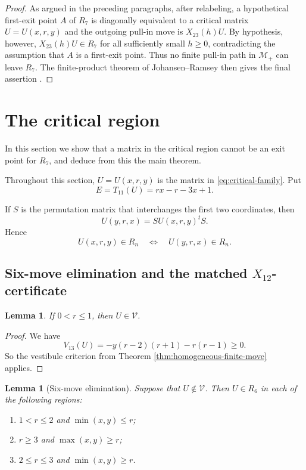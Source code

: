 \documentclass[11pt,onecolumn]{amsart}
\theoremstyle{plain}
\newtheorem{lemma}[theorem]{Lemma}
\theoremstyle{definition}
\theoremstyle{remark}
\newcommand{\V}{\mathcal V}
\begin{document}
\begin{proof}
As argued in the preceding paragraphs,  after relabeling, a hypothetical
first-exit point $A$ of $R_7$ is diagonally equivalent to a critical matrix $U=U(x,r,y)$ and  the outgoing pull-in move is
$X_{23}(h)U$. By hypothesis, however, $X_{23}(h)U\in R_7$ for all
sufficiently small $h\geq 0$, contradicting the assumption that $A$ is a
first-exit point.	
 Thus no finite pull-in path in $\mathcal M_+$ can
leave $R_7$. The finite-product theorem of Johansen--Ramsey then gives the final assertion \cite{JohansenRamsey1979}. 
\end{proof}

\section{The critical region}
\label{sec:critical-region}

In this section we show that a matrix in the critical region cannot be an exit point for $R_7$, and deduce from this the 
main theorem. 



Throughout this section, $U=U(x,r,y)$ is the matrix in
\eqref{eq:critical-family}. Put
\[
E=T_{11}(U)=rx-r-3x+1.
\]

If $S$ is the permutation matrix that  interchanges the first two coordinates,
then
\[
U(y,r,x)=SU(x,r,y)^tS.
\]
Hence
\begin{equation}\label{bysymmetry}
U(x,r,y)\in R_n
\quad\Longleftrightarrow\quad
U(y,r,x)\in R_n.
\end{equation}

\subsection{Six-move elimination and the matched
\texorpdfstring{$X_{12}$}{X12}-certificate}

\begin{lemma}
\label{lem:small-r-vestibule}
If $0<r\leq1$, then $U\in\V$.
\end{lemma}

\begin{proof}
We have
\[
V_{13}(U)=-y(r-2)(r+1)-r(r-1)\geq0.
\]
So the vestibule criterion from Theorem \ref{thm:homogeneous-finite-move} applies.
\end{proof}

\begin{lemma}[Six-move elimination]
\label{lem:R6-elimination}
Suppose that $U\notin\V$.  Then $U\in R_6$ in each of the following
regions:
\begin{enumerate}[(1)]
\item $1<r\leq2$ and $\min(x,y)\leq r$;
\item $r\geq3$ and $\max(x,y)\geq r$;
\item $2\leq r\leq3$ and $\min(x,y)\geq r$.
\end{enumerate}
\end{lemma}
\end{document}

